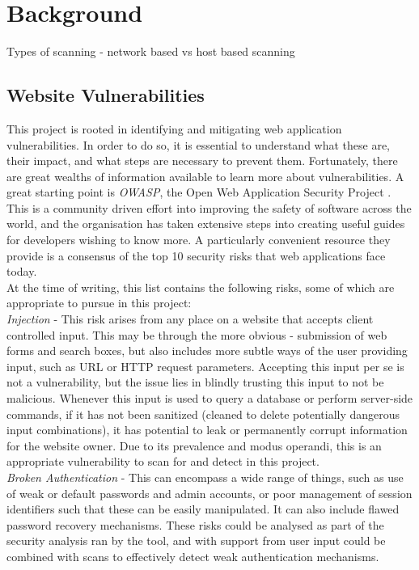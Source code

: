 \chapter{Background}
Types of scanning - network based vs host based scanning


\section {Website Vulnerabilities}

This project is rooted in identifying and mitigating web application vulnerabilities. In order to do so, it is essential to understand what these are, their impact, and what steps are necessary to prevent them. Fortunately, there are great wealths of information available to learn more about vulnerabilities. A great starting point is \textit{OWASP}, the Open Web Application Security Project \cite{owaspPage}. This is a community driven effort into improving the safety of software across the world, and the organisation has taken extensive steps into creating useful guides for developers wishing to know more. A particularly convenient resource they provide is a consensus of the top 10 security risks that web applications face today. \\

At the time of writing, this list contains the following risks, some of which are appropriate to pursue in this project: \\

	\emph{Injection} - This risk arises from any place on a website that accepts client controlled input. This may be through the more obvious - submission of web forms and search boxes, but also includes more subtle ways of the user providing input, such as URL or HTTP request parameters. Accepting this input per se is not a vulnerability, but the issue lies in blindly trusting this input to not be malicious. Whenever this input is used to query a database or perform server-side commands, if it has not been sanitized (cleaned to delete potentially dangerous input combinations), it has potential to leak or permanently corrupt information for the website owner. Due to its prevalence and modus operandi, this is an appropriate vulnerability to scan for and detect in this project. \\
	
	\emph{Broken Authentication} - This can encompass a wide range of things, such as use of weak or default passwords and admin accounts, or poor management of session identifiers such that these can be easily manipulated. It can also include flawed password recovery mechanisms. These risks could be analysed as part of the security analysis ran by the tool, and with support from user input could be combined with scans to effectively detect weak authentication mechanisms. \\
	
